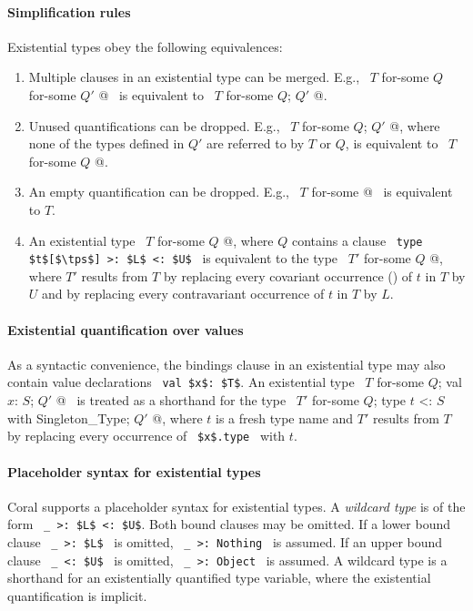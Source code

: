 \paragraph{Simplification rules}
Existential types obey the following equivalences:
\begin{enumerate}
\item
Multiple  clauses in an existential type can be merged. E.g., ~\lstinline@$T$ for-some { $Q$ } for-some { $Q'$ }@~ is equivalent to ~\lstinline@$T$ for-some { $Q$; $Q'$ }@. 

\item
Unused quantifications can be dropped. E.g., ~\lstinline@$T$ for-some { $Q$; $Q'$ }@, where none of the types defined in $Q'$ are referred to by $T$ or $Q$, is equivalent to ~\lstinline@$T$ for-some { $Q$ }@. 

\item
An empty quantification can be dropped. E.g., ~\lstinline@$T$ for-some { }@~ is equivalent to $T$. 

\item
An existential type ~\lstinline@$T$ for-some { $Q$ }@, where $Q$ contains a clause ~\lstinline!type $t$[$\tps$] >: $L$ <: $U$!~ is equivalent to the type ~\lstinline@$T'$ for-some { $Q$ }@, where $T'$ results from $T$ by replacing every covariant occurrence () of $t$ in $T$ by $U$ and by replacing every contravariant occurrence of $t$ in $T$ by $L$. 
\end{enumerate}



\paragraph{Existential quantification over values}
As a syntactic convenience, the bindings clause in an existential type may also contain value declarations ~\lstinline!val $x$: $T$!. An existential type ~\lstinline@$T$ for-some { $Q$; val $x$: $S$; $Q'$ }@~ is treated as a shorthand for the type ~\lstinline@$T'$ for-some { $Q$; type $t$ <: $S$ with Singleton_Type; $Q'$ }@, where $t$ is a fresh type name and $T'$ results from $T$ by replacing every occurrence of ~\lstinline!$x$.type!~ with $t$. 



\paragraph{Placeholder syntax for existential types}
Coral supports a placeholder syntax for existential types. A {\em wildcard type} is of the form ~\lstinline!_ >: $L$ <: $U$!. Both bound clauses may be omitted. If a lower bound clause ~\lstinline!_ >: $L$!~ is omitted, ~\lstinline!_ >: Nothing!~ is assumed. If an upper bound clause ~\lstinline!_ <: $U$!~ is omitted, ~\lstinline!_ >: Object!~ is assumed. A wildcard type is a shorthand for an existentially quantified type variable, where the existential quantification is implicit. 

